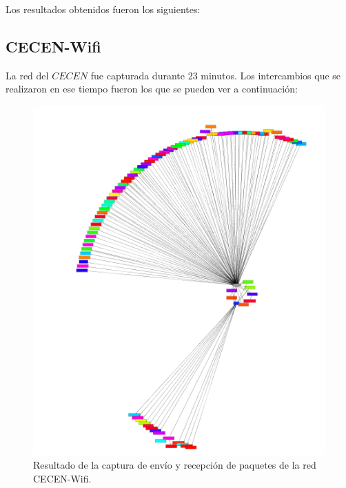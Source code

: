 \documentclass[10pt, a4paper]{article}
\begin{document}
Los resultados obtenidos fueron los siguientes:

\subsection{CECEN-Wifi}

La red del $CECEN$ fue capturada durante 23 minutos. Los intercambios que se realizaron en ese tiempo fueron los que se pueden ver a continuación:
\begin{figure}[H] %
\begin{center}
\includegraphics[width=400pt]{../imgs/cecen_entero.png}
\caption{Resultado de la captura de envío y recepción de paquetes de la red CECEN-Wifi.}
\end{center}
\end{figure}
\end{document}
